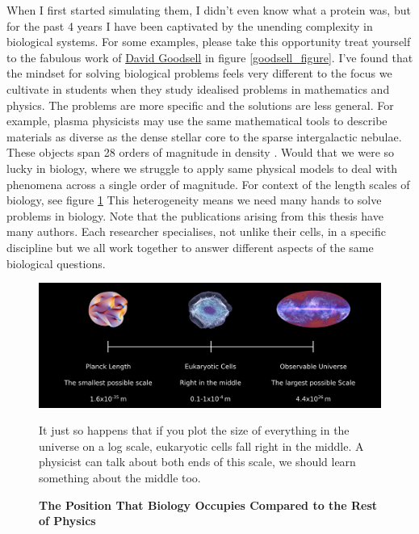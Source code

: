 When I first started simulating them, I didn't even know what a protein was, but for the past 4 years I have been captivated by the unending complexity in biological systems. For some examples, please take this opportunity treat yourself to the fabulous work of \href {https://pdb101.rcsb.org/sci-art/goodsell-gallery}{David Goodsell} in figure \ref{goodsell_figure}. I've found that the mindset for solving biological problems feels very different to the focus we cultivate in students when they study idealised problems in mathematics and physics. The problems are more specific and the solutions are less general. For example, plasma physicists may use the same mathematical tools to describe materials as diverse as the dense stellar core to the sparse intergalactic nebulae. These objects span 28 orders of magnitude in density \cite{chen2018}. Would that we were so lucky in biology, where we struggle to apply same physical models to deal with phenomena across a single order of magnitude. For context of the length scales of biology, see figure \ref{length_scales} This heterogeneity means we need many hands to solve problems in biology. Note that the publications arising from this thesis have many authors. Each researcher specialises, not unlike their cells, in a specific discipline but we all work together to answer different aspects of the same biological questions.

\begin{figure}
	\begin{center}
		\includegraphics[width=1.0\textwidth]{figures/scales.png}
	\end{center}
	\captionsetup{singlelinecheck = false, justification=raggedright}
	\caption[The Position That Biology Occupies Compared to the Rest of Physics] {\textbf{The Position That Biology Occupies Compared to the Rest of Physics}}{It just so happens that if you plot the size of everything  in the universe on a log scale, eukaryotic cells fall right in the middle. A physicist can talk about both ends of this scale, we should learn something about the middle too.}
	\label{length_scales}
\end{figure}

